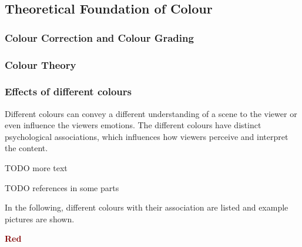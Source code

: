 \documentclass[12pt,a4paper]{article}
\begin{document}
\subsection{Theoretical Foundation of Colour} \label{subsection:theoreticalfoundationofcolour}


\subsubsection*{Colour Correction and Colour Grading} 











\subsubsection*{Colour Theory}










\newpage
\subsubsection*{Effects of different colours} 

Different colours can convey a different understanding of a scene to the viewer or even influence the viewers emotions. 
The different colours have distinct psychological associations, which influences how viewers perceive and interpret the content.\cite{colour}

TODO more text

TODO references in some parts

In the following, different colours with their association are listed and example pictures are shown.




\textbf{\textcolor{Maroon}{Red}}
\end{document}
